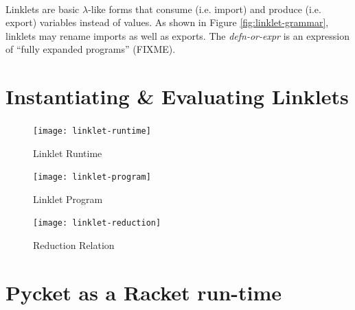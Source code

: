 \documentclass[a4paper]{article}
\begin{document}
\paragraph{} Linklets are basic $\lambda$-like forms that consume
(i.e. import) and produce (i.e. export) variables instead of
values. As shown in Figure \ref{fig:linklet-grammar}, linklets may
rename imports as well as exports. The \emph{defn-or-expr} is an
expression of ``fully expanded programs'' (FIXME).

\section{Instantiating \& Evaluating Linklets}

\paragraph{} 

\begin{figure}[h!]
\begin{center}
\texttt{[image: linklet-runtime]}
\caption{Linklet Runtime}
\end{center}
\end{figure}

\begin{figure}[h!]
\begin{center}
\texttt{[image: linklet-program]}
\caption{Linklet Program}
\end{center}
\end{figure}

\begin{figure}[h!]
\begin{center}
\texttt{[image: linklet-reduction]}
\caption{Reduction Relation}
\end{center}
\end{figure}


\section{Pycket as a Racket run-time}
\end{document}
